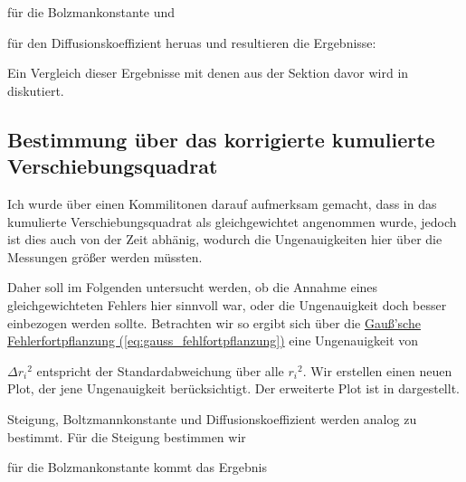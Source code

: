 
für die Bolzmankonstante und 

für den Diffusionskoeffizient heruas und resultieren die Ergebnisse:



Ein Vergleich dieser Ergebnisse mit denen aus der Sektion davor wird in  diskutiert.

\subsection{Bestimmung über das korrigierte kumulierte Verschiebungsquadrat}
Ich wurde über einen Kommilitonen darauf aufmerksam gemacht, dass in  das kumulierte Verschiebungsquadrat als gleichgewichtet angenommen wurde, jedoch ist dies auch von der Zeit abhänig, wodurch die Ungenauigkeiten hier über die Messungen größer werden müssten.

Daher soll im Folgenden untersucht werden, ob die Annahme eines gleichgewichteten Fehlers hier sinnvoll war, oder die Ungenauigkeit doch besser einbezogen werden sollte.
Betrachten wir  so ergibt sich über die \hyperref[eq:gauss_fehlfortpflanzung]{Gauß'sche Fehlerfortpflanzung (\ref*{eq:gauss_fehlfortpflanzung})} eine Ungenauigkeit von


$\Delta {r_i}^2$ entspricht der Standardabweichung über alle ${r_i}^2$. Wir erstellen einen neuen Plot, der jene Ungenauigkeit berücksichtigt. Der erweiterte Plot ist in  dargestellt.


Steigung, Boltzmannkonstante und Diffusionskoeffizient werden analog zu  bestimmt. Für die Steigung bestimmen wir


für die Bolzmankonstante kommt das Ergebnis



